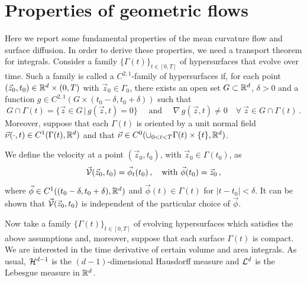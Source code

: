 \section{Properties of geometric flows}\label{sec:geometric_flows_properties}
Here we report some fundamental properties of the mean curvature flow and
surface diffusion. In order to derive these properties, we need a transport
theorem for integrals. Consider a family $\{ \Gamma(t) \}_{t \in [0, T]}$
of hypersurfaces that evolve over time. Such a family is called a
$C^{2,1}$-family of hypersurfaces if, for each point $(\vec z_0, t_0) \in
\mathbb R^d \times (0, T)$ with $\vec z_0 \in \Gamma_0$, there exists an
open set $G \subset \mathbb R^d$, $\delta > 0$ and a function
$g \in C^{2,1}(G \times (t_0 - \delta, t_0 + \delta))$ such that
\begin{equation}
G \cap \Gamma (t) = \{ \vec z \in G \, | \, g (\vec z, t) = 0 \}
\quad \mbox{ and } \quad \nabla \, g (\vec z, t) \neq 0
\quad \forall\ \vec z \in G \cap \Gamma(t) \, .
\end{equation}
\sloppy Moreover, suppose that each $\Gamma(t)$ is oriented by a unit normal
field ${\vec \nu(\cdot,t)\in C^1(\Gamma(t),\mathbb R^d)}$ and that $\vec \nu\in
C^0(\cup_{0<t<T}\Gamma(t)\times\{t\},\mathbb R^d)$.

We define the velocity at a point $(\vec z_0,t_0)$, with $\vec z_0\in
\Gamma(t_0)$, as
\begin{equation}\label{eq:Vphi}
\vec{\mathcal{V}}(\vec z_0,t_0)= \vec \phi_t(t_0)\,, \quad
\mbox{with }\vec \phi(t_0)=\vec z_0\,,
\end{equation}
where $\vec \phi\in C^1((t_0 - \delta, t_0 + \delta),\mathbb R^d)$ and
$\vec \phi(t)\in\Gamma(t)$ for $|t-t_0|<\delta$. It can be shown that $\vec{\mathcal{V}}(\vec
z_0,t_0)$ is independent of the particular choice of $\vec \phi$.

Now take a family $\{ \Gamma(t) \}_{t \in [0, T]}$ of evolving hypersurfaces
which satisfies the above assumptions and, moreover, suppose that each surface
$\Gamma(t)$ is compact. We are interested in the time derivative of certain
volume and area integrals. As usual, $\mathcal{H}^{d-1}$ is the $(d-1)$-dimensional
Hausdorff measure and $\mathcal{L}^d$ is the Lebesgue measure in $\mathbb R^d$.

